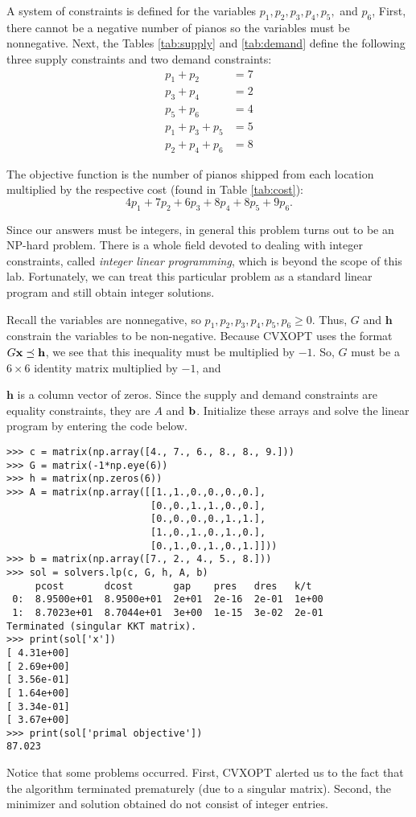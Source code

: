 A system of constraints is defined for the variables $p_1,p_2,p_3,p_4,p_5,$ and $p_6$,
First, there cannot be a negative number of pianos so the variables must be nonnegative.
Next, the Tables \ref{tab:supply} and \ref{tab:demand} define the following three supply constraints and two demand constraints:
\begin{align*}
p_1 + p_2  &= 7\\
p_3 + p_4  &= 2\\
p_5 + p_6  &= 4\\
p_1 + p_3 + p_5 &= 5\\
p_2 + p_4 + p_6 &= 8
\end{align*}

The objective function is the number of pianos shipped from each location multiplied by the respective cost (found in Table \ref{tab:cost}):
\[
4p_1 + 7p_2 + 6p_3 + 8p_4 + 8p_5 + 9p_6.
\]

\begin{info}
Since our answers must be integers, in general this problem turns out to be an NP-hard problem.
There is a whole field devoted to dealing with integer constraints, called \emph{integer linear programming}, which is beyond the scope of this lab.
Fortunately, we can treat this particular problem as a standard linear program and still obtain integer solutions.
\end{info}

Recall the variables are nonnegative, so $p_1,p_2,p_3,p_4,p_5,p_6\geq 0$.
Thus, $G$ and $\mathbf{h}$ constrain the variables to be non-negative.
Because CVXOPT uses the format $G\mathbf{x} \preceq \mathbf{h}$, we see that this inequality must be multiplied by $-1$. 
So, $G$ must be a $6 \times 6$ identity matrix multiplied by $-1$, and

$\mathbf{h}$ is a column vector of zeros.
Since the supply and demand constraints are equality constraints, they are $A$ and $\mathbf{b}$.
Initialize these arrays and solve the linear program by entering the code below.
\begin{lstlisting}
>>> c = matrix(np.array([4., 7., 6., 8., 8., 9.]))
>>> G = matrix(-1*np.eye(6))
>>> h = matrix(np.zeros(6))
>>> A = matrix(np.array([[1.,1.,0.,0.,0.,0.],
                         [0.,0.,1.,1.,0.,0.],
                         [0.,0.,0.,0.,1.,1.],
                         [1.,0.,1.,0.,1.,0.],
                         [0.,1.,0.,1.,0.,1.]]))
>>> b = matrix(np.array([7., 2., 4., 5., 8.]))
>>> sol = solvers.lp(c, G, h, A, b)
     pcost       dcost       gap    pres   dres   k/t
 0:  8.9500e+01  8.9500e+01  2e+01  2e-16  2e-01  1e+00
 1:  8.7023e+01  8.7044e+01  3e+00  1e-15  3e-02  2e-01
Terminated (singular KKT matrix).
>>> print(sol['x'])
[ 4.31e+00]
[ 2.69e+00]
[ 3.56e-01]
[ 1.64e+00]
[ 3.34e-01]
[ 3.67e+00]
>>> print(sol['primal objective'])
87.023
\end{lstlisting}
Notice that some problems occurred. First, CVXOPT alerted us to the fact that the algorithm terminated prematurely (due to a singular matrix).
Second, the minimizer and solution obtained do not consist of integer entries.

